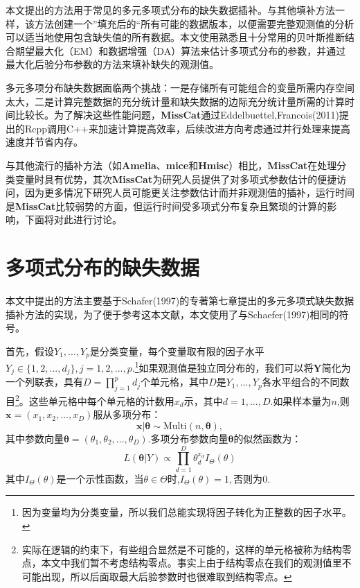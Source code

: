 \documentclass[12pt,hyperref,a4paper,UTF8]{ctexart}
\begin{document}
本文提出的方法用于常见的多元多项式分布的缺失数据插补。与其他填补方法一样，该方法创建一个”填充后的“所有可能的数据版本，以便需要完整观测值的分析可以适当地使用包含缺失值的所有数据。本文使用熟悉且十分常用的贝叶斯推断结合期望最大化（EM）和数据增强（DA）算法来估计多项式分布的参数，并通过最大化后验分布参数的方法来填补缺失的观测值。

多元多项分布缺失数据面临两个挑战：一是存储所有可能组合的变量所需内存空间太大，二是计算完整数据的充分统计量和缺失数据的边际充分统计量所需的计算时间比较长。为了解决这些性能问题，\textbf{MissCat}通过Eddelbuettel,Francois(2011)提出的Rcpp调用C++来加速计算提高效率，后续改进方向考虑通过并行处理来提高速度并节省内存。

与其他流行的插补方法（如\textbf{Amelia}、\textbf{mice}和\textbf{Hmisc}）相比，\textbf{MissCat}在处理分类变量时具有优势，其次\textbf{MissCat}为研究人员提供了对多项式参数估计的便捷访问，因为更多情况下研究人员可能更关注参数估计而并非观测值的插补，运行时间是\textbf{MissCat}比较弱势的方面，但运行时间受多项式分布复杂且繁琐的计算的影响，下面将对此进行讨论。


\section{多项式分布的缺失数据}
本文中提出的方法主要基于Schafer(1997)的专著第七章提出的多元多项式缺失数据插补方法的实现，为了便于参考这本文献，本文使用了与Schaefer(1997)相同的符号。

首先，假设$Y_1,...,Y_p$是分类变量，每个变量取有限的因子水平$Y_j\in\{1,2,...,d_j\},j=1,2,...,p.$\footnote{因为变量均为分类变量，所以我们总能实现将因子转化为正整数的因子水平。}如果观测值是独立同分布的，我们可以将$\boldsymbol{Y}$简化为一个列联表，具有$D=\prod_{j=1}^p d_j$个单元格，其中$D$是$Y_1,...,Y_p$各水平组合的不同数目\footnote{实际在逻辑的约束下，有些组合显然是不可能的，这样的单元格被称为结构零点，本文中我们暂不考虑结构零点。事实上由于结构零点在我们的观测值里不可能出现，所以后面取最大后验参数时也很难取到结构零点。}。这些单元格中每个单元格的计数用$x_d$示，其中$d=1,...,D.$如果样本量为$n$,则$\boldsymbol{x}=(x_1,x_2,...,x_D)$服从多项分布：
\begin{equation*}
    \boldsymbol{x}|\boldsymbol{\theta}\sim \text{Multi}(n,\boldsymbol{\theta}),
\end{equation*}
其中参数向量$\boldsymbol{\theta}=(\theta_1,\theta_2,...,\theta_D).$多项分布参数向量$\boldsymbol{\theta}$的似然函数为：
\begin{equation}
    L(\boldsymbol{\theta}|Y)\propto\prod_{d=1}^D\theta_d^{x_d}I_{\Theta}(\theta)\label{7.3}
\end{equation}
其中$I_{\Theta}(\theta)$是一个示性函数，当$\theta\in\Theta$时,$I_{\Theta}(\theta)=1,$否则为$0.$
\end{document}
